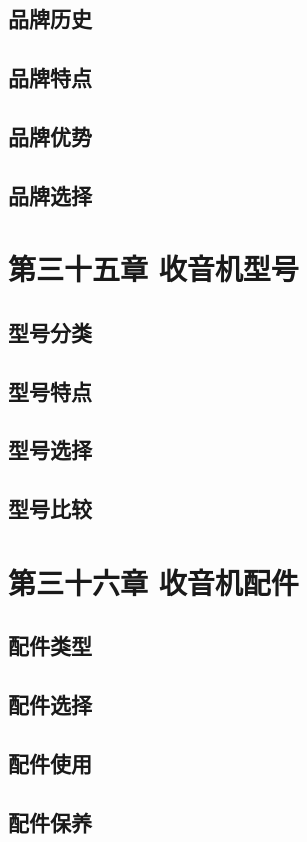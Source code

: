 \documentclass[12pt,UTF8]{ctexbook}
\begin{document}
\section{品牌历史}
\section{品牌特点}
\section{品牌优势}
\section{品牌选择}

\chapter{第三十五章 收音机型号}

\section{型号分类}
\section{型号特点}
\section{型号选择}
\section{型号比较}

\chapter{第三十六章 收音机配件}

\section{配件类型}
\section{配件选择}
\section{配件使用}
\section{配件保养}
\end{document}

